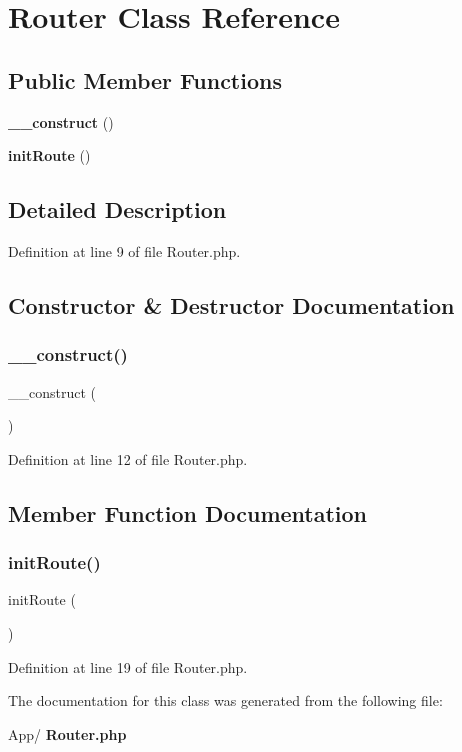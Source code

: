 \section{Router Class Reference}
\label{class_app_1_1_router}
\subsection*{Public Member Functions}
\begin{DoxyCompactItemize}
\item 
\textbf{ \+\_\+\+\_\+construct} ()
\item 
\textbf{ init\+Route} ()
\end{DoxyCompactItemize}


\subsection{Detailed Description}


Definition at line 9 of file Router.\+php.



\subsection{Constructor \& Destructor Documentation}
\mbox{\label{class_app_1_1_router_a095c5d389db211932136b53f25f39685}} 
\subsubsection{\+\_\+\+\_\+construct()}
{\footnotesize\ttfamily \+\_\+\+\_\+construct (\begin{DoxyParamCaption}{ }\end{DoxyParamCaption})}



Definition at line 12 of file Router.\+php.



\subsection{Member Function Documentation}
\mbox{\label{class_app_1_1_router_a6fa8800727e8e7eeab56d569bfa3429b}} 
\subsubsection{init\+Route()}
{\footnotesize\ttfamily init\+Route (\begin{DoxyParamCaption}{ }\end{DoxyParamCaption})}



Definition at line 19 of file Router.\+php.



The documentation for this class was generated from the following file\+:\begin{DoxyCompactItemize}
\item 
App/\textbf{ Router.\+php}\end{DoxyCompactItemize}
